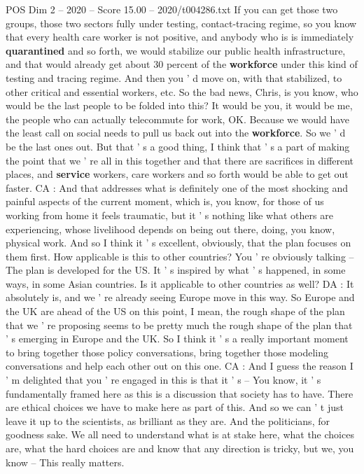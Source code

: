 \begin{textsample}{POS Dim 2 – 2020 – Score 15.00 – 2020/t004286.txt}
If you can get those two groups, those two sectors fully under testing, contact-tracing regime, so you know that every health care worker is not positive, and anybody who is is immediately \textbf{quarantined} and so forth, we would stabilize our public health infrastructure, and that would already get about 30 percent of the \textbf{workforce} under this kind of testing and tracing regime.
And then you ' d move on, with that stabilized, to other critical and essential workers, etc.
So the bad news, Chris, is you know, who would be the last people to be folded into this?
It would be you, it would be me, the people who can actually telecommute for work, OK.
Because we would have the least call on social needs to pull us back out into the \textbf{workforce}.
So we ' d be the last ones out.
But that ' s a good thing, I think that ' s a part of making the point that we ' re all in this together and that there are sacrifices in different places, and \textbf{service} workers, care workers and so forth would be able to get out faster.
CA : And that addresses what is definitely one of the most shocking and painful aspects of the current moment, which is, you know, for those of us working from home it feels traumatic, but it ' s nothing like what others are experiencing, whose livelihood depends on being out there, doing, you know, physical work.
And so I think it ' s excellent, obviously, that the plan focuses on them first.
How applicable is this to other countries?
You ' re obviously talking -- The plan is developed for the US.
It ' s inspired by what ' s happened, in some ways, in some Asian countries.
Is it applicable to other countries as well?
DA : It absolutely is, and we ' re already seeing Europe move in this way.
So Europe and the UK are ahead of the US on this point, I mean, the rough shape of the plan that we ' re proposing seems to be pretty much the rough shape of the plan that ' s emerging in Europe and the UK.
So I think it ' s a really important moment to bring together those policy conversations, bring together those modeling conversations and help each other out on this one.
CA : And I guess the reason I ' m delighted that you ' re engaged in this is that it ' s -- You know, it ' s fundamentally framed here as this is a discussion that society has to have.
There are ethical choices we have to make here as part of this.
And so we can ' t just leave it up to the scientists, as brilliant as they are.
And the politicians, for goodness sake.
We all need to understand what is at stake here, what the choices are, what the hard choices are and know that any direction is tricky, but we, you know -- This really matters.

\end{textsample}
